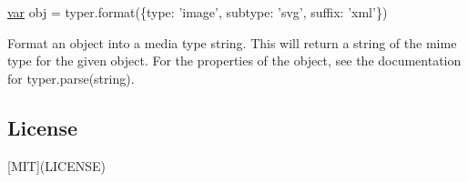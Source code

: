 \begin{DoxyCode}
\hyperlink{018__def_8c_a335628f2e9085305224b4f9cc6e95ed5}{var} obj = typer.format(\{type: \textcolor{stringliteral}{'image'}, subtype: \textcolor{stringliteral}{'svg'}, suffix: \textcolor{stringliteral}{'xml'}\})
\end{DoxyCode}


Format an object into a media type string. This will return a string of the mime type for the given object. For the properties of the object, see the documentation for {\ttfamily typer.\+parse(string)}.

\subsection*{License}

\mbox{[}M\+I\+T\mbox{]}(L\+I\+C\+E\+N\+S\+E) 